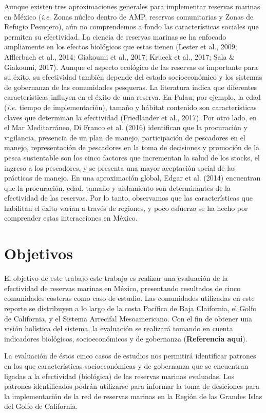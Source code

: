 \documentclass[12pt,]{article}
\begin{document}
Aunque existen tres aproximaciones generales para implementar reservas
marinas en México (\emph{i.e.} Zonas núcleo dentro de AMP, reservas
comunitarias y Zonas de Refugio Pesuqero), aún no comprendemos a fondo
las características sociales que permiten su efectividad. La ciencia de
reservas marinas se ha enfocado ampliamente en los efectos biológicos
que estas tienen (Lester et al., 2009; Afflerbach et al., 2014; Giakoumi
et al., 2017; Krueck et al., 2017; Sala \& Giakoumi, 2017). Aunque el
aspecto ecológico de las reservas es importante para su éxito, su
efectividad también depende del estado socioeconómico y los sistemas de
gobernanza de las comunidades pesqueras. La literatura indica que
diferentes características influyen en el éxito de una reserva. En
Palau, por ejemplo, la edad (\emph{i.e.} tiempo de implementación),
tamaño y hábitat contenido son características claves que determinan la
efectividad (Friedlander et al., 2017). Por otro lado, en el Mar
Meditarráneo, Di Franco et al. (2016) identifican que la procuración y
vigilancia, presencia de un plan de manejo, participación de pescadores
en el manejo, representación de pescadores en la toma de decisiones y
promoción de la pesca sustentable son los cinco factores que incrementan
la salud de los stocks, el ingreso a los pescadores, y se presenta una
mayor aceptación social de las prácticas de manejo. En una aproximación
global, Edgar et al. (2014) encuentran que la procuración, edad, tamaño
y aislamiento son determinantes de la efectividad de las reservas. Por
lo tanto, observamos que las características que habilitan el éxito
varían a través de regiones, y poco esfuerzo se ha hecho por comprender
estas interacciones en México.

\section{Objetivos}\label{objetivos}

El objetivo de este trabajo este trabajo es realizar una evaluación de
la efectividad de reservas marinas en México, presentando resultados de
cinco comunidades costeras como caso de estudio. Las comunidades
utilizadas en este reporte se distribuyen a lo largo de la costa
Pacífica de Baja Claifornia, el Golfo de California, y el Sistema
Arrecifal Mesoamericano. Con el fin de obtener una visión holística del
sistema, la evaluación se realizará tomando en cuenta indicadores
biológicos, socioeconómicos y de gobernanza (\textbf{Referencia aqui}).

La evaluación de éstos cinco casos de estudios nos permitirá identificar
patrones en los que características socioeconómicas y de gobernanza que
se encuentran ligadas a la efectividad (biológica) de las reservas
marinas evaluadas. Los patrones identificados podrán utilizarse para
informar la toma de desiciones para la implementación de la red de
reservas marinas en la Región de las Grandes Islas del Golfo de
California.
\end{document}
